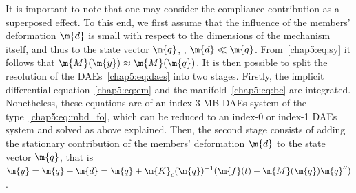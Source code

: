 It is important to note that one may consider the compliance contribution as a superposed effect. To this end, we first assume that the influence of the members' deformation $\m{d}$ is small with respect to the dimensions of the mechanism itself, and thus to the state vector $\m{q}$, \ie{}, $\m{d} \ll \m{q}$. From~\eqref{chap5:eq:sy} it follows that $\m{M}(\m{y}) \approx \m{M}(\m{q})$. It is then possible to split the resolution of the \acp{DAE}~\eqref{chap5:eq:daes} into two stages. Firstly, the implicit differential equation~\eqref{chap5:eq:em} and the manifold~\eqref{chap5:eq:bc} are integrated. Nonetheless, these equations are of an index-3 \ac{MB} \acp{DAE} system of the type~\eqref{chap5:eq:mbd_fo}, which can be reduced to an index-0 or index-1 \acp{DAE} system and solved as above explained. Then, the second stage consists of adding the stationary contribution of the members' deformation $\m{d}$ to the state vector $\m{q}$, that is $\m{y} = \m{q} + \m{d} = \m{q} + \m{K}_c(\m{q})^{-1} (\m{f}(t) - \m{M}(\m{q})\m{q}^{\prime\prime})$.

